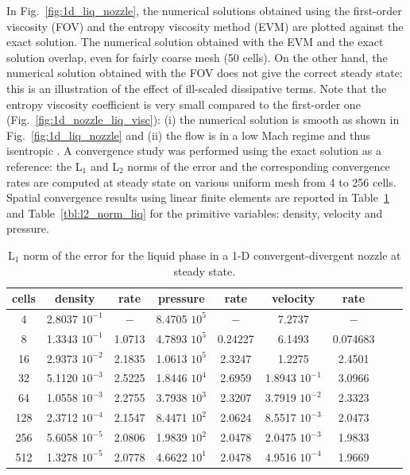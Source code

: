 \documentclass[preprint,10pt]{elsarticle}
\newcommand{\fig}[1]{Fig.~\ref{#1}}                      %
\newcommand{\tbl}[1]{Table~\ref{#1}}                     %
\begin{document}
%
In \fig{fig:1d_liq_nozzle}, the numerical solutions obtained using the first-order viscosity (FOV) and the entropy viscosity method (EVM) are plotted against the exact solution. The numerical solution obtained with the EVM and the exact solution overlap, even for fairly coarse mesh (50 cells).
On the other hand, the numerical solution obtained with the FOV does not give the correct steady state: this is an illustration of the effect of ill-scaled dissipative terms. 
%
Note that the entropy viscosity coefficient is very small compared to the first-order one (\fig{fig:1d_nozzle_liq_visc}): (i) the numerical solution is smooth as shown in \fig{fig:1d_liq_nozzle} and (ii) the flow is in a low Mach regime and thus isentropic . A convergence study was performed using the exact solution as a reference: the L$_1$ and L$_2$ norms of the error and the corresponding convergence rates are computed at steady state on various uniform mesh from 4 to 256 cells. Spatial convergence results using linear finite elements are reported in \tbl{tbl:l1_norm_liq} and \tbl{tbl:l2_norm_liq} for the primitive variables: density, velocity and pressure.
%
\begin{table}[H]
\begin{center}
 \caption{\label{tbl:l1_norm_liq} L$_1$ norm of the error for the liquid phase in a 1-D convergent-divergent nozzle at steady state.}
 \begin{tabular}{|c|c|c|c|c|c|c|c|c|}
 \hline
cells & density         & rate   & pressure        & rate    & velocity         & rate     \\ \hline
4    & 2.8037 $10^{-1}$ & $-$    & 8.4705 $10^{5}$ & $-$     & 7.2737           & $-$      \\ \hline
8    & 1.3343 $10^{-1}$ & 1.0713 & 4.7893 $10^{5}$ & 0.24227 & 6.1493           & 0.074683 \\ \hline
16   & 2.9373 $10^{-2}$ & 2.1835 & 1.0613 $10^{5}$ & 2.3247  & 1.2275           & 2.4501   \\ \hline
32   & 5.1120 $10^{-3}$ & 2.5225 & 1.8446 $10^{4}$ & 2.6959  & 1.8943 $10^{-1}$ & 3.0966   \\ \hline
64   & 1.0558 $10^{-3}$ & 2.2755 & 3.7938 $10^{3}$ & 2.3207  & 3.7919 $10^{-2}$ & 2.3323   \\ \hline
128  & 2.3712 $10^{-4}$ & 2.1547 & 8.4471 $10^{2}$ & 2.0624  & 8.5517 $10^{-3}$ & 2.0473   \\ \hline
256  & 5.6058 $10^{-5}$ & 2.0806 & 1.9839 $10^{2}$ & 2.0478  & 2.0475 $10^{-3}$ & 1.9833   \\ \hline
512  & 1.3278 $10^{-5}$ & 2.0778 & 4.6622 $10^{1}$ & 2.0478  & 4.9516 $10^{-4}$ & 1.9669   \\ \hline
\end{tabular}
\end{center}
\end{table}
\end{document}

